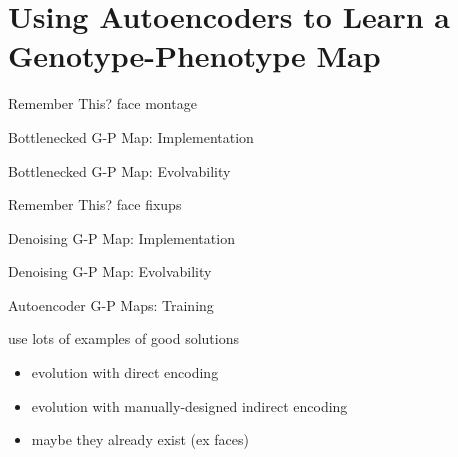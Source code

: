 \section{Using Autoencoders to Learn a Genotype-Phenotype Map}

\begin{frame}{Remember This?}
face montage
\end{frame}

\begin{frame}{Bottlenecked G-P Map: Implementation}

\end{frame}

\begin{frame}{Bottlenecked G-P Map: Evolvability}

\end{frame}

\begin{frame}{Remember This?}
face fixups
\end{frame}

\begin{frame}{Denoising G-P Map: Implementation}

\end{frame}

\begin{frame}{Denoising G-P Map: Evolvability}

\end{frame}

\begin{frame}{Autoencoder G-P Maps: Training}

use lots of examples of good solutions
\begin{itemize}
\item evolution with direct encoding
\item evolution with manually-designed indirect encoding
\item maybe they already exist (ex faces)
\end{itemize}

\end{frame}
